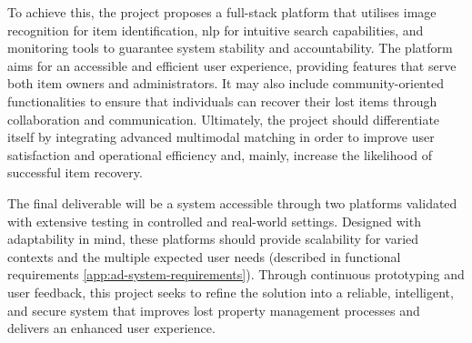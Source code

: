 To achieve this, the project proposes a full-stack platform that utilises image recognition for item identification, \ac{nlp} for intuitive search capabilities, and monitoring tools to guarantee system stability and accountability. The platform aims for an accessible and efficient user experience, providing features that serve both item owners and administrators. It may also include community-oriented functionalities to ensure that individuals can recover their lost items through collaboration and communication. Ultimately, the project should differentiate itself by integrating advanced multimodal matching in order to improve user satisfaction and operational efficiency and, mainly, increase the likelihood of successful item recovery.

The final deliverable will be a system accessible through two platforms validated with extensive testing in controlled and real-world settings. Designed with adaptability in mind, these platforms should provide scalability for varied contexts and the multiple expected user needs (described in functional requirements \ref{app:ad-system-requirements}). Through continuous prototyping and user feedback, this project seeks to refine the solution into a reliable, intelligent, and secure system that improves lost property management processes and delivers an enhanced user experience.

